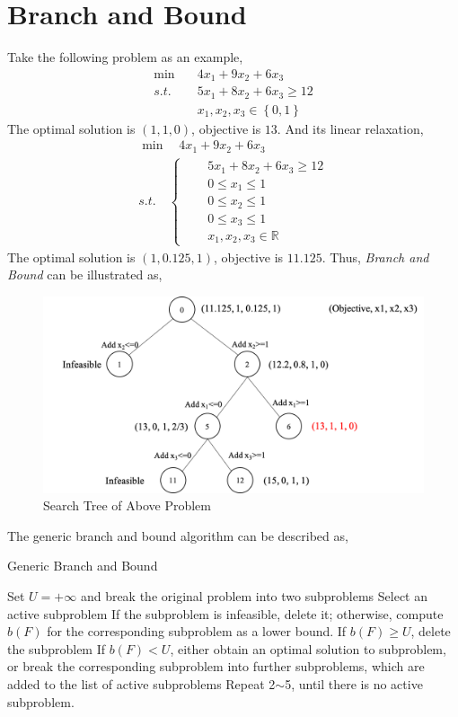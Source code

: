 \documentclass{article}
\begin{document}
\newpage
\section{Branch and Bound}

Take the following problem as an example,
\begin{align}
\min \quad & 4x_1 + 9x_2 + 6x_3 \\
s.t. \quad & 5x_1 + 8x_2 + 6x_3 \geq 12 \\
& x_1, x_2, x_3 \in \left\{0, 1\right\}
\end{align}
The optimal solution is $(1, 1, 0)$, objective is $13$. And its linear relaxation,
\begin{align}
\min \quad  4x_1 + 9x_2 + 6x_3 \qquad\qquad  \\
s.t. \quad \left\{
\begin{aligned}
& \quad 5x_1 + 8x_2 + 6x_3 \geq 12 \\
& \quad 0 \leq x_1 \leq 1 \\
& \quad 0 \leq x_2 \leq 1 \\
& \quad 0 \leq x_3 \leq 1 \\
& \quad x_1, x_2, x_3 \in \mathbb{R}
\end{aligned} \right.
\end{align}
The optimal solution is $(1, 0.125, 1)$, objective is $11.125$. Thus, \textit{Branch and Bound} can be illustrated as,

\begin{figure}[htbp]
	\centering
	\includegraphics[width=0.8\linewidth]{./figure/rn-b-a-c-tree.png}
	\caption{Search Tree of Above Problem}
	\label{fig:bb}
\end{figure}

\noindent The generic branch and bound algorithm can be described as,
\begin{algorithm}[htbp]
	\caption{Generic Branch and Bound}
	\label{alg:bb}
	\begin{algorithmic}[1]
		\State Set $U = +\infty$ and break the original problem into two subproblems
		\State Select an active subproblem
		\State If the subproblem is infeasible, delete it; otherwise, compute $b(F)$ for the corresponding subproblem as a lower bound.
		\State If $b(F) \geq U$, delete the subproblem
		\State If $b(F) < U$, either obtain an optimal solution to subproblem, or break the corresponding subproblem into further subproblems, which are added to the list of active subproblems
		\State Repeat 2$\sim$5, until there is no active subproblem.
	\end{algorithmic}  
\end{algorithm} 
\end{document}
